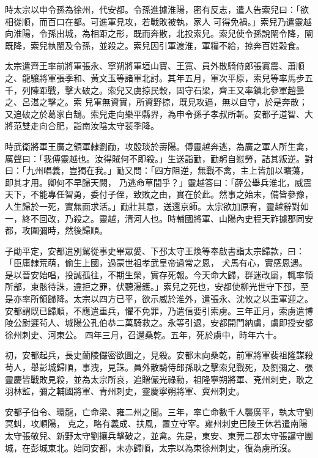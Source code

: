 \begin{pinyinscope}
 時太宗以申令孫為徐州，代安都。令孫進據淮陽，密有反志，遣人告索兒曰：「欲相從順，而百口在都。可進軍見攻，若戰敗被執，家人
 可得免禍。」索兒乃遣靈越向淮陽，令孫出城，為相距之形，既而奔散，北投索兒。索兒使令孫說闡令降，闡既降，索兒執闡及令孫，並殺之。索兒因引軍渡淮，軍糧不給，掠奔百姓穀食。



 太宗遣齊王率前將軍張永、寧朔將軍垣山寶、王寬、員外散騎侍郎張寘震、蕭順之、龍驤將軍張季和、黃文玉等諸軍北討。其年五月，軍次平原，索兒等率馬步五千，列陳距戰，擊大破之。索兒又虜掠民穀，固守石梁，齊王又率鎮北參軍趙曇之、呂湛之擊之。索
 兒軍無資實，所資野掠，既見攻逼，無以自守，於是奔散；又追破之於葛家白鵠。索兒走向樂平縣界，為申令孫子孝叔所斬。安都子道智、大將范雙走向合肥，詣南汝陰太守裴季降。



 時武衛將軍王廣之領軍隸劉勔，攻殷琰於壽陽。傅靈越奔逃，為廣之軍人所生禽，厲聲曰：「我傅靈越也。汝得賊何不即殺。」生送詣勔，勔躬自慰勞，詰其叛逆。對曰：「九州唱義，豈獨在我。」勔又問：「四方阻逆，無戰不禽，主上皆加以曠蕩，即其才用。卿何不早歸天闕，
 乃逃命草間乎？」靈越答曰：「薛公舉兵淮北，威震天下，不能專任智勇，委付子侄，致敗之由，實在於此。然事之始末，備皆參豫，人生歸於一死，實無面求活。」勔壯其意，送還京師。太宗欲加原宥，靈越辭對如一，終不回改，乃殺之。靈越，清河人也。時輔國將軍、山陽內史程天祚據郡同安都，攻圍彌時，然後歸順。



 子勛平定，安都遣別駕從事史畢眾愛、下邳太守王煥等奉啟書詣太宗歸款，曰：「臣庸隸荒萌，偷生上國，過蒙世祖孝武皇帝過常之恩，
 犬馬有心，實感恩遇。是以晉安始唱，投誠孤往，不期生榮，實存死報。今天命大歸，群迷改屬，輒率領所部，束骸待誅，違拒之罪，伏聽湯鑊。」索兒之死也，安都使柳光世守下邳，至是亦率所領歸降。太宗以四方已平，欲示威於淮外，遣張永、沈攸之以重軍迎之。安都謂既已歸順，不應遣重兵，懼不免罪，乃遣信要引索虜。三年正月，索虜遣博陵公尉遲茍人、城陽公孔伯恭二萬騎救之。永等引退，安都開門納虜，虜即授安都徐州刺史、河東公。
 四年三月，召還桑乾。五年，死於虜中，時年六十。



 初，安都起兵，長史蘭陵儼密欲圖之，見殺。安都未向桑乾，前軍將軍裴祖隆謀殺茍人，舉彭城歸順，事洩，見誅。員外散騎侍郎孫耿之擊索兒戰死，及劉彌之、張靈慶皆戰敗見殺，並為太宗所哀，追贈儼光祿勳，祖隆寧朔將軍、兗州刺史，耿之羽林監，彌之輔國將軍、青州刺史，靈慶寧朔將軍、冀州刺史。



 安都子伯令、環龍，亡命梁、雍二州之間。三年，率亡命數千人襲廣平，執太守劉冥虯，攻順陽，
 克之，略有義成、扶風，置立守宰。雍州刺史巴陵王休若遣南陽太守張敬兒、新野太守劉攘兵擊破之，並禽。先是，東安、東莞二郡太守張讜守團城，在彭城東北。始同安都，未亦歸順，太宗以為東徐州刺史，復為虜所沒。




\end{pinyinscope}
